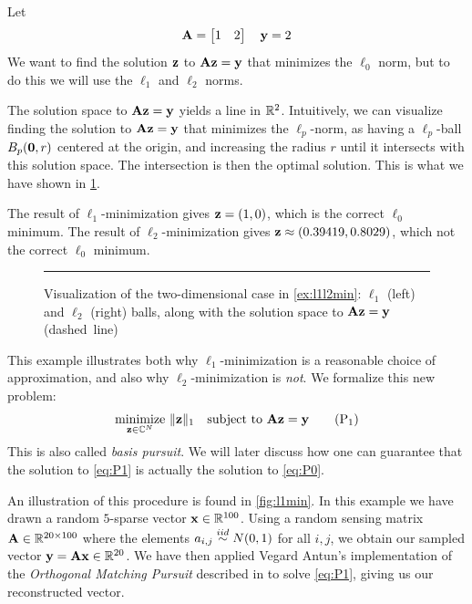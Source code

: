 \begin{example} \label{ex:l1l2min}
Let
\[ 
	\mathbf{A} = \begin{bmatrix}1 & 2\end{bmatrix} \quad \mathbf{y} = 2
\]
We want to find the solution $ \mathbf{z} $ to $ \mathbf{A}\mathbf{z} = \mathbf{y} $ that minimizes the $ \ell_{0} $ norm, but to do this we will use the $ \ell_{1} $ and $ \ell_{2} $ norms.

The solution space to $ \mathbf{A}\mathbf{z} = \mathbf{y} $ yields a line in $ \mathbb{R}^{2} $. Intuitively, we can visualize finding the solution to $ \mathbf{A}\mathbf{z} = \mathbf{y} $ that minimizes the $ \ell_{p} $-norm, as having a $ \ell_{p} $-ball $ B_{p}(\mathbf{0}, r) $ centered at the origin, and increasing the radius $ r $ until it intersects with this solution space. The intersection is then the optimal solution. This is what we have shown in \cref{fig:l1l2balls}.

The result of $ \ell_{1} $-minimization gives $ \mathbf{z} = (1, 0) $, which is the correct $ \ell_{0} $ minimum. The result of $ \ell_{2} $-minimization gives $ \mathbf{z} \approx (0.39419, 0.8029) $, which not the correct $ \ell_{0} $ minimum. 
\end{example}
\begin{figure}[t]
	\centering
	
	\caption{Visualization of the two-dimensional case in \cref{ex:l1l2min}: $ \ell_{1} $ (left) and $ \ell_{2} $ (right) balls, along with the solution space to $ \mathbf{A}\mathbf{z} = \mathbf{y} $ (dashed~line)}
	\label{fig:l1l2balls}
	\vspace{4pt}\hrule
\end{figure}

This example illustrates both why $ \ell_{1} $-minimization is a reasonable choice of approximation, and also why $ \ell_{2} $-minimization is \textit{not}. We formalize this new problem:
\begin{equation}
	\underset{\mathbf{z} \in \mathbb{C}^{N}}{\text{minimize}}~ \lVert\mathbf{z}\rVert_1
	\quad\text{subject to}~ \mathbf{A}\mathbf{z} = \mathbf{y}
	\tag{P$_1$}
	\label{eq:P1}
\end{equation}
This is also called \textit{basis pursuit}. We will later discuss how one can guarantee that the solution to \eqref{eq:P1} is actually the solution to \eqref{eq:P0}.

An illustration of this procedure is found in \cref{fig:l1min}. In this example we have drawn a random $ 5 $-sparse vector $ \mathbf{x} \in \mathbb{R}^{100} $. Using a random sensing matrix $ \mathbf{A} \in \mathbb{R}^{20\times 100} $ where the elements $ a_{i,j} \stackrel{iid}{\sim} N(0, 1) $ for all $ i,j $,  we obtain our sampled vector $ \mathbf{y} = \mathbf{A}\mathbf{x} \in\mathbb{R}^{20} $. We have then applied Vegard Antun's implementation of the \textit{Orthogonal Matching Pursuit} described in \cite[Section~3.2]{foucart13intro} to solve \eqref{eq:P1}, giving us our reconstructed vector.\nocite{antunAlgs}


